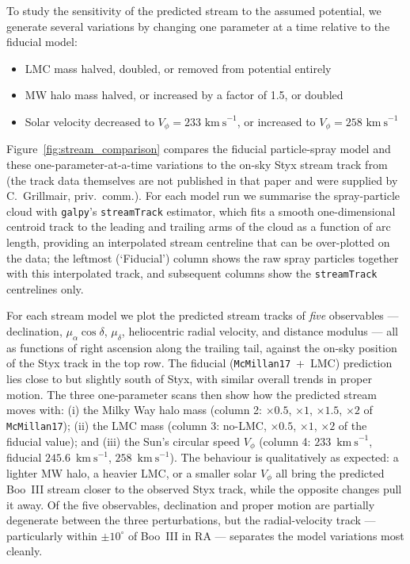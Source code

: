 \documentclass[twocolumn, apj, numberedappendix, appendixfloats]{openjournal_dhayaa}
\newcommand{\vlosUnits}{$\mathrm{km~s}^{-1}$\xspace}
\begin{document}
\label{tab:streamspray_params}

To study the sensitivity of the predicted stream to the assumed potential, we generate several variations by changing one parameter at a time relative to the fiducial model:
\begin{itemize}[itemsep=0pt]
    \item LMC mass halved, doubled, or removed from potential entirely
    \item MW halo mass halved, or increased by a factor of 1.5, or doubled
    \item Solar velocity decreased to $V_\phi = 233$ \vlosUnits, or increased to $V_\phi = 258$ \vlosUnits
\end{itemize}
Figure~\ref{fig:stream_comparison} compares the fiducial particle-spray model and these one-parameter-at-a-time variations to the on-sky Styx stream track from \citet{Grillmair2009} (the track data themselves are not published in that paper and were supplied by C.~Grillmair, priv.~comm.). For each model run we summarise the spray-particle cloud with \texttt{galpy}'s \texttt{streamTrack} estimator, which fits a smooth one-dimensional centroid track to the leading and trailing arms of the cloud as a function of arc length, providing an interpolated stream centreline that can be over-plotted on the data; the leftmost (`Fiducial') column shows the raw spray particles together with this interpolated track, and subsequent columns show the \texttt{streamTrack} centrelines only.

For each stream model we plot the predicted stream tracks of \emph{five} observables --- declination, $\mu_\alpha\cos\delta$, $\mu_\delta$, heliocentric radial velocity, and distance modulus --- all as functions of right ascension along the trailing tail, against the on-sky position of the Styx track in the top row. The fiducial (\texttt{McMillan17}~+~LMC) prediction lies close to but slightly south of Styx, with similar overall trends in proper motion. The three one-parameter scans then show how the predicted stream moves with: (i) the Milky Way halo mass (column 2: $\times 0.5$, $\times 1$, $\times 1.5$, $\times 2$ of \texttt{McMillan17}); (ii) the LMC mass (column 3: no-LMC, $\times 0.5$, $\times 1$, $\times 2$ of the fiducial value); and (iii) the Sun's circular speed $V_\phi$ (column 4: $233$~\vlosUnits, fiducial $245.6$~\vlosUnits, $258$~\vlosUnits). The behaviour is qualitatively as expected: a lighter MW halo, a heavier LMC, or a smaller solar $V_\phi$ all bring the predicted Boo~III stream closer to the observed Styx track, while the opposite changes pull it away. Of the five observables, declination and proper motion are partially degenerate between the three perturbations, but the radial-velocity track --- particularly within $\pm 10^\circ$ of Boo~III in RA --- separates the model variations most cleanly.
\end{document}
